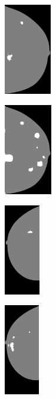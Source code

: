 \documentclass{beamer}
\begin{document}
\begin{frame}
		\begin{figure}[h]
		\centering
			\begin{subfigure}{0.24\textwidth}
				\centering
					\includegraphics[height=4cm]{plots/label_ex1.png}
			\end{subfigure}
			\begin{subfigure}{0.24\textwidth}
				\centering
					\includegraphics[height=4cm]{plots/segmentation_ex1_v3_zeropointone.png}
			\end{subfigure}
			\begin{subfigure}{0.24\textwidth}
				\centering
					\includegraphics[height=4cm]{plots/label_ex2.png}
			\end{subfigure}
			\begin{subfigure}{0.24\textwidth}
				\centering
					\includegraphics[height=4cm]{plots/segmentation_ex2_v3_zeropointone.png}
			\end{subfigure}
		\end{figure}
		
	\end{frame}
\end{document}

